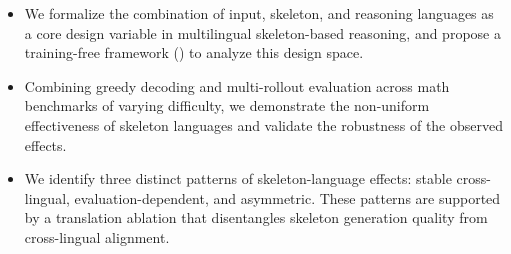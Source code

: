 \begin{itemize}
    \item We formalize the combination of input, skeleton, and reasoning languages as a core design variable in multilingual skeleton-based reasoning, and propose a training-free framework (\Lasef) to analyze this design space.
    
    \item Combining greedy decoding and multi-rollout evaluation across math benchmarks of varying difficulty, we demonstrate the non-uniform effectiveness of skeleton languages and validate the robustness of the observed effects.
    
    \item We identify three distinct patterns of skeleton-language effects: stable cross-lingual, evaluation-dependent, and asymmetric. These patterns are supported by a translation ablation that disentangles skeleton generation quality from cross-lingual alignment.
\end{itemize}






